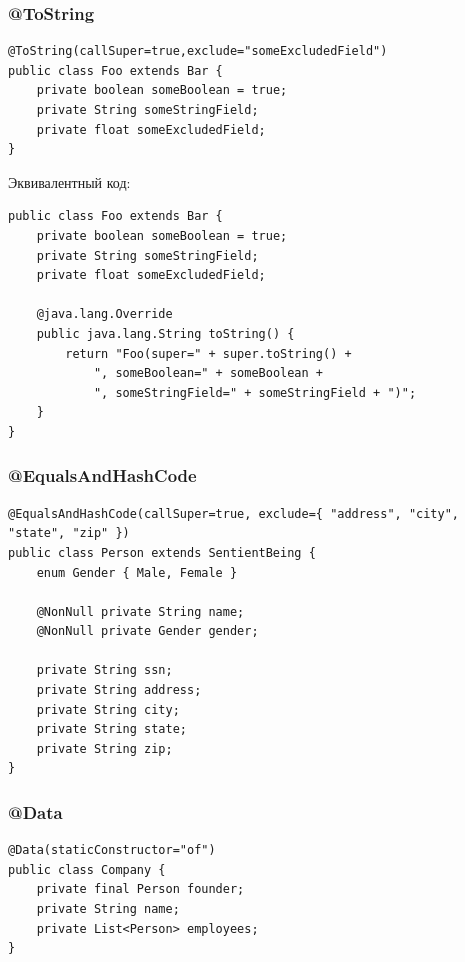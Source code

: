 \documentclass[xetex,mathserif,serif]{beamer}
\begin{document}
	\begin{frame}[fragile]
		\frametitle{@ToString}
		\begin{footnotesize}
			\begin{verbatim}
@ToString(callSuper=true,exclude="someExcludedField")
public class Foo extends Bar {
    private boolean someBoolean = true;
    private String someStringField;
    private float someExcludedField;
}
		\end{verbatim}
		Эквивалентный код:
		\begin{verbatim}
public class Foo extends Bar {
    private boolean someBoolean = true;
    private String someStringField;
    private float someExcludedField;
    
    @java.lang.Override
    public java.lang.String toString() {
        return "Foo(super=" + super.toString() +
            ", someBoolean=" + someBoolean +
            ", someStringField=" + someStringField + ")";
    }
}
			\end{verbatim}
		\end{footnotesize}
	\end{frame}

	\begin{frame}[fragile]
		\frametitle{@EqualsAndHashCode}
		\begin{footnotesize}
			\begin{verbatim}
@EqualsAndHashCode(callSuper=true, exclude={ "address", "city", "state", "zip" })
public class Person extends SentientBeing {
    enum Gender { Male, Female }

    @NonNull private String name;
    @NonNull private Gender gender;
    
    private String ssn;
    private String address;
    private String city;
    private String state;
    private String zip;
}
			\end{verbatim}
		\end{footnotesize}
	\end{frame}

	\begin{frame}[fragile]
		\frametitle{@Data}
		\begin{verbatim}
@Data(staticConstructor="of")
public class Company {
    private final Person founder;
    private String name;
    private List<Person> employees;
}
		\end{verbatim}
	\end{frame}
\end{document}
